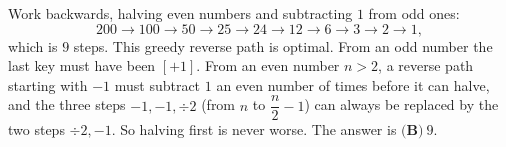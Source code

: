 Work backwards, halving even numbers and subtracting $1$ from odd ones:
\[200\to100\to50\to25\to24\to12\to6\to3\to2\to1,\]
which is $9$ steps. This greedy reverse path is optimal. From an odd number the last key must have been $[+1]$. From an even number $n>2$, a reverse path starting with $-1$ must subtract $1$ an even number of times before it can halve, and the three steps $-1,-1,\div2$ (from $n$ to $\dfrac n2-1$) can always be replaced by the two steps $\div2,-1$. So halving first is never worse. The answer is $\boxed{\textbf{(B)}\ 9}$.
